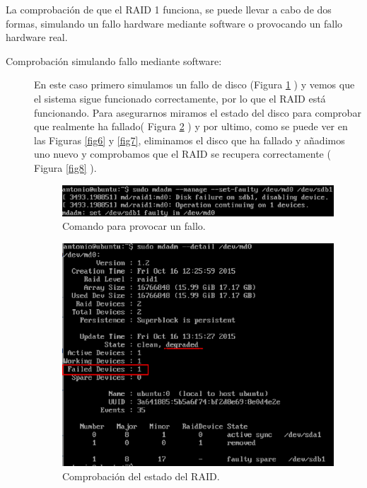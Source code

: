 La comprobación de que el RAID 1 funciona, se puede llevar a cabo de dos formas, simulando un fallo hardware mediante software o provocando un fallo hardware real.

\begin{description}
    \item[Comprobación simulando fallo mediante software:\cite{pruebaraid}]

 En este caso primero simulamos un fallo de disco (Figura \ref{fig4} ) y vemos que el sistema  sigue funcionado correctamente, por lo que el RAID  está funcionando. Para asegurarnos miramos el estado del disco para comprobar que realmente ha fallado( Figura \ref{fig5} ) y por ultimo, como se puede ver en las Figuras \ref{fig6} y \ref{fig7}, eliminamos el disco que ha fallado y añadimos uno nuevo y comprobamos que el RAID se recupera correctamente ( Figura \ref{fig8} ).

                \begin{figure}[H]
                    \begin{center}
                        \includegraphics[scale=0.6]{Imagenes/fallo.eps}
                        \caption{Comando para provocar un fallo.}
                        \label{fig4}
                    \end{center}
                \end{figure}

            \begin{figure}[H]
                \begin{center}
                    \includegraphics[scale=0.5]{Imagenes/estado_fallo.eps}
                    \caption{Comprobación del estado del RAID.}
                    \label{fig5}
                \end{center}
            \end{figure}


\end{description}
